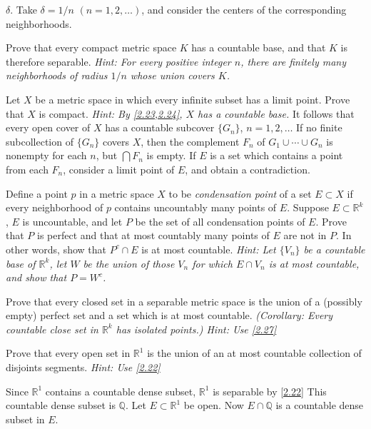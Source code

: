 \begin{exercise}
  \(\delta\).
  Take \(\delta = 1/n\) \((n = 1,2,\ldots)\), and consider the centers of the
  corresponding neighborhoods.
\item
  Prove that every compact metric space \(K\) has a countable base, and that
  \(K\) is therefore separable.
  \textit{Hint: For every positive integer \(n\), there are finitely many
    neighborhoods of radius \(1/n\) whose union covers \(K\).}
\item
  Let \(X\) be a metric space in which every infinite subset has a limit point.
  Prove that \(X\) is compact.
  \textit{Hint: By \cref{2.23,2.24}, \(X\) has a countable base.}
  It follows that every open cover of \(X\) has a countable subcover
  \(\{G_n\}\), \(n = 1,2,\ldots\)
  If no finite subcollection of \(\{G_n\}\) covers \(X\), then the complement
  \(F_n\) of \(G_1\cup\cdots\cup G_n\) is nonempty for each \(n\), but
  \(\bigcap F_n\) is empty.
  If \(E\) is a set which contains a point from each \(F_n\), consider a limit
  point of \(E\), and obtain a contradiction.
\item
  \label{2.27}
  Define a point \(p\) in a metric space \(X\) to be
  \textit{condensation point} of a set \(E\subset X\) if every neighborhood of
  \(p\) contains uncountably many points of \(E\).
  Suppose \(E\subset\mathbb{R}^k\), \(E\) is uncountable, and let \(P\) be the
  set of all condensation points of \(E\).
  Prove that \(P\) is perfect and that at most countably many points of \(E\)
  are not in \(P\).
  In other words, show that \(P^c\cap E\) is at most countable.
  \textit{Hint: Let \(\{V_n\}\) be a countable base of \(\mathbb{R}^k\), let
    \(W\) be the union of those \(V_n\) for which \(E\cap V_n\) is at most
    countable, and show that \(P = W^c\).}
\item
  Prove that every closed set in a separable metric space is the union of a
  (possibly empty) perfect set and a set which is at most countable.
  \textit{(Corollary: Every countable close set in \(\mathbb{R}^k\) has
    isolated points.)
    Hint: Use \cref{2.27}}
\item
  \label{2.29}
  Prove that every open set in \(\mathbb{R}^1\) is the union of an at most
  countable collection of disjoints segments.
  \textit{Hint: Use \cref{2.22}}
  \par\smallskip
  Since \(\mathbb{R}^1\) contains a countable dense subset, \(\mathbb{R}^1\) is
  separable by \cref{2.22}
  This countable dense subset is \(\mathbb{Q}\).
  Let \(E\subset\mathbb{R}^1\) be open.
  Now \(E\cap\mathbb{Q}\) is a countable dense subset in \(E\).

\end{exercise}

